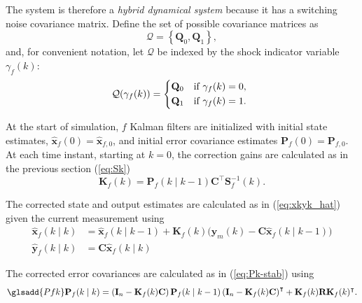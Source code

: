 The system is therefore a \textit{hybrid dynamical system} because it has a switching noise covariance matrix. Define the set of possible covariance matrices as
\begin{equation} \label{eq:init_Q_R}
	\mathcal{Q} = \left\{\mathbf{Q}_0, \mathbf{Q}_1\right\},
\end{equation}
and, for convenient notation, let $\mathcal{Q}$ be indexed by the shock indicator variable $\gamma_f(k)$:
\begin{equation} \label{eq:init_Q}
	\mathcal{Q}(\gamma_f(k)) = 
	\begin{cases*}
		\mathbf{Q}_0 & \text{if} $\gamma_f(k)=0$, \\
		\mathbf{Q}_1 & \text{if} $\gamma_f(k)=1$.
	\end{cases*}
\end{equation}


At the start of simulation, $f$ Kalman filters are initialized with initial state estimates, $\mathbf{\hat{x}}_f(0) = \mathbf{\hat{x}}_{f,0}$, and initial error covariance estimates $	\mathbf{P}_f(0) = \mathbf{P}_{f,0}$. At each time instant, starting at $k=0$, the correction gains are calculated as in the previous section (\ref{eq:Sk})
\begin{equation} \label{eq:Kfk}
	\mathbf{K}_f(k) = \mathbf{P}_f(k \mid k-1)\mathbf{C}^\intercal \mathbf{S}_f^{-1}(k).
\end{equation}

The corrected state and output estimates are calculated as in (\ref{eq:xkyk_hat}) given the current measurement using
\begin{equation} \label{eq:xfkyfk_hat}
	\begin{aligned}
		\mathbf{\hat{x}}_f(k \mid k) &= \mathbf{\hat{x}}_f(k \mid k-1) + \mathbf{K}_f(k) \big( \mathbf{y}_m(k) - \mathbf{C} \mathbf{\hat{x}}_f(k \mid k-1) \big) \\
		\mathbf{\hat{y}}_f(k \mid k) &= \mathbf{C} \mathbf{\hat{x}}_f(k \mid k)
	\end{aligned}
\end{equation}

The corrected error covariances are calculated as in (\ref{eq:Pk-stab}) using 
\begin{equation} \label{eq:Pkf-stab} \glsadd{Pfk}
	\mathbf{P}_f(k \mid k) = \left( \mathbf{I}_n - \mathbf{K}_f(k) \mathbf{C} \right ) \mathbf{P}_f(k \mid k-1) \left( \mathbf{I}_n - \mathbf{K}_f(k) \mathbf{C} \right )^\intercal + \mathbf{K}_f(k)  \mathbf{R} \mathbf{K}_f(k)^\intercal.
\end{equation}

